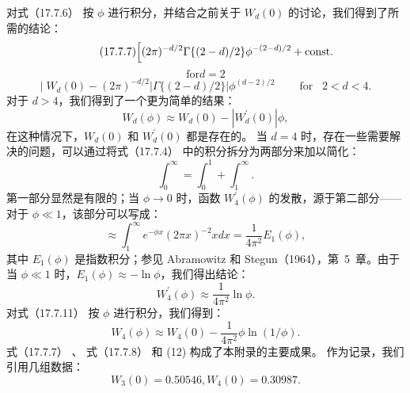 对式（17.7.6） 按 \(\phi\) 进行积分，并结合之前关于 \(W_{d}(0)\) 的讨论，我们得到了所需的结论：
\begin{equation}\tag{17.7.7}\label{eq:17.7.7}
\Bigl [ ( 2 \pi ) ^{- d / 2} \Gamma \{ ( 2 - d ) / 2 \} \phi ^{- ( 2 - d ) / 2} + \mathrm { c o n s t . }
\end{equation}
\begin{equation}\tag{17.7.8}\label{eq:17.7.8}
\mathrm { f o r }  d = 2
\end{equation}
\begin{equation}\tag{17.7.9}\label{eq:17.7.9}
\Big | \; W _ { d } ( 0 ) - ( 2 \pi ) ^{- d / 2} | \Gamma \{ ( 2 - d ) / 2 \} | \phi ^{( d - 2 ) / 2} \; \; \; \; \; \; \; \; \mathrm { f o r } \; \; \; 2 < d < 4 .
\end{equation}
对于 \(d > 4\)，我们得到了一个更为简单的结果：
\begin{equation}\tag{17.7.10}\label{eq:17.7.10}
W _ { d } ( \phi ) \approx W _ { d } ( 0 ) - | W _ { d } ^{\prime} ( 0 ) | \phi ,
\end{equation}
在这种情况下，\(W_{d}(0)\) 和 \(W_{d}^{\prime}(0)\) 都是存在的。
当 \(d=4\) 时，存在一些需要解决的问题，可以通过将式（17.7.4） 中的积分拆分为两部分来加以简化：
\begin{equation}\tag{17.7.11}\label{eq:17.7.11}
\int _ { 0 } ^{\infty} = \int _ { 0 } ^{1} + \int _ { 1 } ^{\infty} .
\end{equation}
第一部分显然是有限的；当 \(\phi \rightarrow 0\) 时，函数 \(W_{4}^{\prime}(\phi)\) 的发散，源于第二部分——对于 \(\phi \ll 1\)，该部分可以写成：
\begin{equation}\tag{17.7.12}\label{eq:17.7.12}
\approx \int _ { 1 } ^{\infty} e ^{- \phi x} ( 2 \pi x ) ^{- 2} x d x = \frac { 1 } { 4 \pi ^{2} } E _ { 1 } ( \phi ) ,
\end{equation}
其中 \(E_{1}(\phi)\) 是指数积分；参见 Abramowitz 和 Stegun（1964），第~5~章。由于当 \(\phi \ll 1\) 时，\(E_{1}(\phi) \approx -\ln \phi\)，我们得出结论：
\begin{equation}\tag{17.7.13}\label{eq:17.7.13}
W _ { 4 } ^{\prime} ( \phi ) \approx \frac { 1 } { 4 \pi ^{2} } \ln \phi .
\end{equation}
对式（17.7.11） 按 \(\phi\) 进行积分，我们得到：
\begin{equation}\tag{17.7.14}\label{eq:17.7.14}
W _ { 4 } ( \phi ) \approx W _ { 4 } ( 0 ) - \frac { 1 } { 4 \pi ^{2} } \phi \ln ( 1 / \phi ) .
\end{equation}
式（17.7.7） 、 式（17.7.8） 和 (12) 构成了本附录的主要成果。
作为记录，我们引用几组数据：
\begin{equation}\tag{17.7.15}\label{eq:17.7.15}
W _ { 3 } ( 0 ) = 0 . 50 54 6 ,  W _ { 4 } ( 0 ) = 0 . 30 98 7 .
\end{equation}
